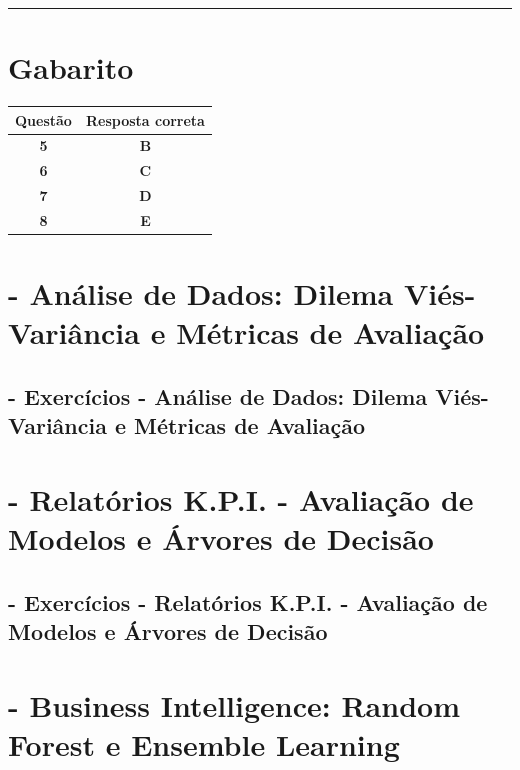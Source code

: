 \documentclass[
]{book}
\begin{document}
\begin{center}\rule{0.5\linewidth}{0.5pt}\end{center}

\chapter{Gabarito}\label{gabarito-1}

\begin{longtable}[]{@{}cc@{}}
\toprule\noalign{}
\textbf{Questão} & \textbf{Resposta correta} \\
\midrule\noalign{}
\endhead
\bottomrule\noalign{}
\endlastfoot
\textbf{5} & \textbf{B} \\
\textbf{6} & \textbf{C} \\
\textbf{7} & \textbf{D} \\
\textbf{8} & \textbf{E} \\
\end{longtable}

\chapter{- Análise de Dados: Dilema Viés-Variância e Métricas de Avaliação}\label{anuxe1lise-de-dados-dilema-viuxe9s-variuxe2ncia-e-muxe9tricas-de-avaliauxe7uxe3o}

\section{- Exercícios - Análise de Dados: Dilema Viés-Variância e Métricas de Avaliação}\label{exercuxedcios---anuxe1lise-de-dados-dilema-viuxe9s-variuxe2ncia-e-muxe9tricas-de-avaliauxe7uxe3o}

\chapter{- Relatórios K.P.I. - Avaliação de Modelos e Árvores de Decisão}\label{relatuxf3rios-k.p.i.---avaliauxe7uxe3o-de-modelos-e-uxe1rvores-de-decisuxe3o}

\section{- Exercícios - Relatórios K.P.I. - Avaliação de Modelos e Árvores de Decisão}\label{exercuxedcios---relatuxf3rios-k.p.i.---avaliauxe7uxe3o-de-modelos-e-uxe1rvores-de-decisuxe3o}

\chapter{- Business Intelligence: Random Forest e Ensemble Learning}\label{business-intelligence-random-forest-e-ensemble-learning}
\end{document}
